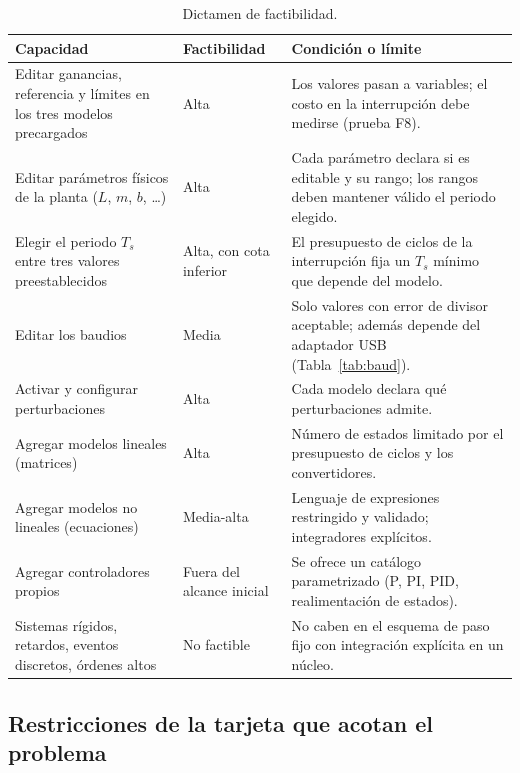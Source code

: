 \documentclass[12pt,letterpaper]{article}
\begin{document}
\begin{table}[!htbp]
\centering
\caption{Dictamen de factibilidad.}
\label{tab:dictamen}
\begin{tabularx}{\textwidth}{>{\raggedright\arraybackslash}p{4.1cm}>{\raggedright\arraybackslash}p{2.2cm}Y}
\toprule
\textbf{Capacidad} & \textbf{Factibilidad} & \textbf{Condición o límite} \\
\midrule
Editar ganancias, referencia y límites en los tres modelos precargados & Alta & Los valores pasan a variables; el costo en la interrupción debe medirse (prueba F8). \\
Editar parámetros físicos de la planta ($L$, $m$, $b$, \dots) & Alta & Cada parámetro declara si es editable y su rango; los rangos deben mantener válido el periodo elegido. \\
Elegir el periodo $T_s$ entre tres valores preestablecidos & Alta, con cota inferior & El presupuesto de ciclos de la interrupción fija un $T_s$ mínimo que depende del modelo. \\
Editar los baudios & Media & Solo valores con error de divisor aceptable; además depende del adaptador USB (Tabla~\ref{tab:baud}). \\
Activar y configurar perturbaciones & Alta & Cada modelo declara qué perturbaciones admite. \\
Agregar modelos lineales (matrices) & Alta & Número de estados limitado por el presupuesto de ciclos y los convertidores. \\
Agregar modelos no lineales (ecuaciones) & Media-alta & Lenguaje de expresiones restringido y validado; integradores explícitos. \\
Agregar controladores propios & Fuera del alcance inicial & Se ofrece un catálogo parametrizado (P, PI, PID, realimentación de estados). \\
Sistemas rígidos, retardos, eventos discretos, órdenes altos & No factible & No caben en el esquema de paso fijo con integración explícita en un núcleo. \\
\bottomrule
\end{tabularx}
\end{table}

\subsection{Restricciones de la tarjeta que acotan el problema}
\end{document}
